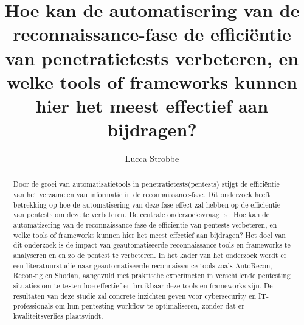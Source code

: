 \documentclass{hogent-article}
\title{Hoe kan de automatisering van de reconnaissance-fase de efficiëntie van penetratietests verbeteren, en welke tools of frameworks kunnen hier het meest \newline effectief aan bijdragen?}
\author{Lucca Strobbe}
\begin{document}
 

\begin{abstract}
  Door de groei van automatisatietools in penetratietests(pentests) stijgt de efficiëntie van het verzamelen van informatie in de reconnaissance-fase. 
  Dit onderzoek heeft betrekking op hoe de automatisering van deze fase effect zal hebben
  op de efficiëntie van pentests om deze te verbeteren. De centrale onderzoeksvraag is : Hoe kan de automatisering van de reconnaissance-fase de efficiëntie van pentests verbeteren, en welke tools of frameworks kunnen hier het meest effectief aan bijdragen?
  Het doel van dit onderzoek is de impact van geautomatiseerde reconnaissance-tools en frameworks te analyseren en en zo de pentest te verbeteren. 
  In het kader van het onderzoek wordt er een literatuurstudie naar geautomatiseerde reconnaissance-tools zoals AutoRecon, Recon-ng en Shodan, aangevuld met praktische 
  experimeten in verschillende pentesting situaties om te testen hoe effectief en bruikbaar deze tools en frameworks zijn. De resultaten van deze studie zal concrete 
  inzichten geven voor cybersecurity en IT-professionals om hun pentesting-workflow te optimaliseren, zonder dat er kwaliteitsverlies plaatsvindt.

\end{abstract}

\tableofcontents



\printbibliography[heading=bibintoc]
\end{document}
